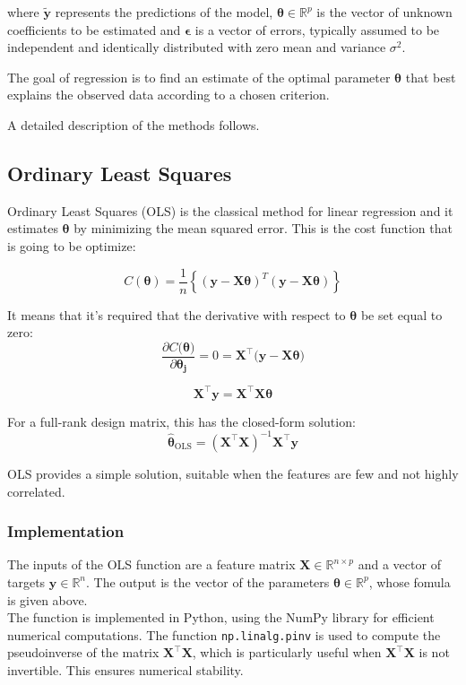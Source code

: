 \documentclass[%
 reprint,            %
 amsmath,amssymb,
 aps,
]{revtex4-2}
\begin{document}
where $\tilde{\mathbf{y}}$ represents the predictions of the model, $\boldsymbol{\theta} \in \mathbb{R}^p$ is the vector of unknown coefficients to be estimated and $\boldsymbol{\epsilon}$ is a vector of errors, typically assumed to be independent and identically distributed with zero mean and variance $\sigma^2$.

The goal of regression is to find an estimate of the optimal parameter $\boldsymbol{\theta}$ that best explains the observed data according to a chosen criterion. 

A detailed description of the methods follows.

\subsection{Ordinary Least Squares}
Ordinary Least Squares (OLS) is the classical method for linear regression and it estimates $\boldsymbol{\theta}$ by minimizing the mean squared error. This is the cost function that is going to be optimize:

$$
C(\boldsymbol{\theta})=\frac{1}{n}\left\{\left(\boldsymbol{y}-\boldsymbol{X}\boldsymbol{\theta}\right)^T\left(\boldsymbol{y}-\boldsymbol{X}\boldsymbol{\theta}\right)\right\}$$

It means that it's required that the derivative with respect to $\boldsymbol{\theta}$ be set equal to zero: $$\frac{\partial C(\boldsymbol{\theta)}}{\partial \boldsymbol{\theta_j}} =0= \mathbf{X}^\top(\mathbf{y-X\boldsymbol{\theta})}$$

$$\mathbf{X}^\top \mathbf{y}= \mathbf{X}^\top \mathbf{X} \boldsymbol{\theta}$$

For a full-rank design matrix, this has the closed-form solution:
$$
\hat{\boldsymbol{\theta}}_{\text{OLS}} = (\mathbf{X}^\top \mathbf{X})^{-1} \mathbf{X}^\top \mathbf{y}
$$

OLS provides a simple solution, suitable when the features are few and not highly correlated.

\subsubsection{Implementation}
The inputs of the OLS function are a feature matrix $\mathbf{X} \in \mathbb{R}^{n \times p}$ and a vector of targets $\mathbf{y} \in \mathbb{R}^n$. The output is the vector of the parameters $\boldsymbol{\theta} \in \mathbb{R}^{p}$, whose fomula is given above.\\
The function is implemented in Python, using the NumPy library for efficient numerical computations. The function \texttt{np.linalg.pinv} is used to compute the pseudoinverse of the matrix $\mathbf{X}^\top \mathbf{X}$, which is particularly useful when $\mathbf{X}^\top \mathbf{X}$ is not invertible. This ensures numerical stability.
\end{document}
